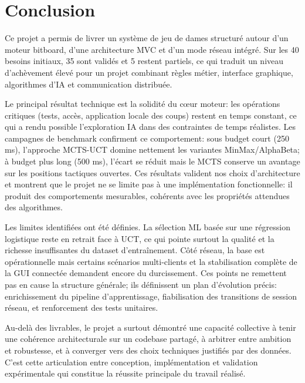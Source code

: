 \documentclass[a4paper]{article}
\begin{document}
\section*{Conclusion}

Ce projet a permis de livrer un système de jeu de dames structuré autour d’un moteur bitboard, 
d’une architecture MVC et d’un mode réseau intégré. Sur les 40 besoins initiaux, 35 sont validés 
et 5 restent partiels, ce qui traduit un niveau d’achèvement élevé pour un projet combinant 
règles métier, interface graphique, algorithmes d’IA et communication distribuée.

Le principal résultat technique est la solidité du cœur moteur: les opérations critiques 
(tests, accès, application locale des coups) restent en temps constant, ce qui a rendu possible 
l’exploration IA dans des contraintes de temps réalistes. Les campagnes de benchmark confirment ce 
comportement: sous budget court (250 ms), l’approche MCTS-UCT domine nettement les variantes 
MinMax/AlphaBeta; à budget plus long (500 ms), l’écart se réduit mais le MCTS conserve un avantage sur 
les positions tactiques ouvertes. Ces résultats valident nos choix d’architecture et montrent que 
le projet ne se limite pas à une implémentation fonctionnelle: il produit des comportements 
mesurables, cohérents avec les propriétés attendues des algorithmes.

Les limites identifiées ont été définies. La sélection ML basée sur une régression logistique 
reste en retrait face à UCT, ce qui pointe surtout la qualité et la richesse insuffisantes du dataset 
d’entraînement. Côté réseau, la base est opérationnelle mais certains scénarios multi-clients et la 
stabilisation complète de la GUI connectée demandent encore du durcissement. Ces points ne remettent 
pas en cause la structure générale; ils définissent un plan d’évolution précis: enrichissement du 
pipeline d’apprentissage, fiabilisation des transitions de session réseau, et renforcement des 
tests unitaires.

Au-delà des livrables, le projet a surtout démontré une capacité collective à tenir une cohérence 
architecturale sur un codebase partagé, à arbitrer entre ambition et robustesse, et à converger vers 
des choix techniques justifiés par des données. C’est cette articulation entre conception, implémentation 
et validation expérimentale qui constitue la réussite principale du travail réalisé.
\end{document}

